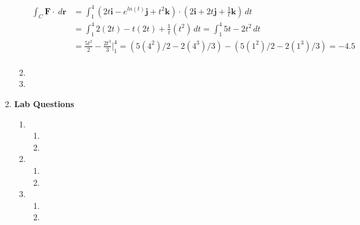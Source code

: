 \documentclass[11pt]{article}
\newcommand{\Newpage}{\end{preview}\begin{preview}}
\begin{document}
\begin{preview}
\begin{enumerate}
\begin{enumerate}
\begin{align*}
                    \int_C \textbf{F} \cdot \; d \textbf{r} & = \int_{1}^{4} \left(2t \textbf{i} - e^{ln(t)} \textbf{j} + t^2 \textbf{k}\right) \cdot \left(2 \textbf{i} + 2t \textbf{j} + \frac{1}{t} \textbf{k}\right)\,dt \\
                                                            & = \int_{1}^{4} 2(2t) - t(2t) + \frac{1}{t}(t^2) \,dt  = \int_{1}^{4} 5t - 2t^2 \,dt \\
                                                            &= \frac{5t^2}{2} - \frac{2t^3}{3} \Big|_{1}^{4} = (5(4^2)/2 - 2(4^3)/3) - (5(1^2)/2 - 2(1^3)/3)=-4.5\\
                  \end{align*}
            \item
            \item
          \end{enumerate}
    \item \textbf{Lab Questions}
          \begin{enumerate}
            \item
                  \begin{enumerate}
                    \item
                    \item
                  \end{enumerate}
            \item
                  \begin{enumerate}
                    \item
                    \item
                  \end{enumerate}
            \item
                  \begin{enumerate}
                    \item
                    \item
                  \end{enumerate}
          \end{enumerate}
  \end{enumerate}

  \Newpage


\end{preview}
\end{document}
